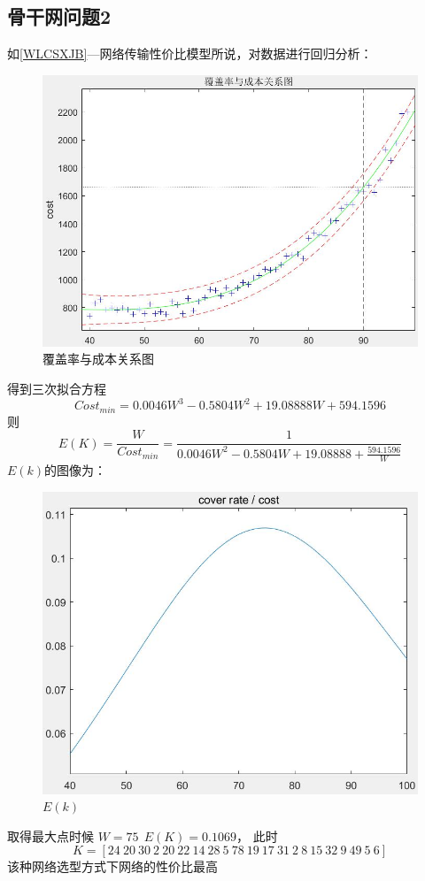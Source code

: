 \documentclass[UTF8,12pt]{ctexart}
\begin{document}
    \subsection{骨干网问题2}
        如\ref{WLCSXJB}—网络传输性价比模型所说，对数据进行回归分析：
        \begin{figure}[H]
            \centering
            \includegraphics[scale=0.4]{cosHG.jpg}   %
            \caption{覆盖率与成本关系图}
            \end{figure} 
        得到三次拟合方程
        $$Cost_{min}=0.0046W^3-0.5804W^2+19.08888W+594.1596$$
        则
        $$E(K)=\frac{W}{Cost_{min}}=\frac{1}{0.0046W^2-0.5804W+19.08888+\frac{594.1596}{W}}$$
        $E(k)$的图像为：
        \begin{figure}[H]
            \centering
            \includegraphics[scale=0.45]{cosEK.jpg}   %
            \caption{$E(k)$}
            \end{figure} 
        取得最大点时候 $W=75~~E(K)=0.1069$，
        此时$$K=[24~20~30~2~20~22~14~28~5~78~19~17~31~2~8~15~32~9~49~5~6]$$
        该种网络选型方式下网络的性价比最高
\end{document}
